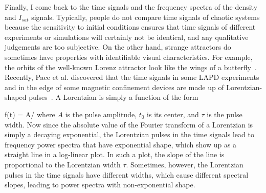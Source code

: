 Finally, I come back to the time signals and the frequency spectra of the density and $I_{sat}$ signals. Typically, people do not compare time signals of chaotic systems because the sensitivity
to initial conditions ensures that time signals of different experiments or simulations will certainly not be identical, and any qualitative judgements are too subjective. On the other hand,
strange attractors do sometimes have properties with identifiable visual characteristics. For example, the orbits of the well-known Lorenz attractor look like the wings of a butterfly~\cite{lorenz1963}.
Recently, Pace et al. discovered that the time signals in some LAPD experiments and in the edge of some magnetic confinement devices
 are made up of Lorentzian-shaped pulses~\cite{pace2008a,pace2008b}. A Lorentzian is simply a function of the form

\beq
\label{lorentz_eqn}
f(t) = A/
\eeq
where $A$ is the pulse amplitude, $t_0$ is its center, and $\tau$ is the pulse width. Now since the absolute value of the Fourier transform of a Lorentzian is simply a decaying exponential,
the Lorentzian pulses in the time signals lead to frequency power spectra that have exponential shape, which show up as a straight line in a log-linear plot. In such a plot, the slope of the line
is proportional to the Lorentzian width $\tau$. Sometimes, however, the Lorentzian
pulses in the time signals have different widths, which cause different spectral slopes, leading to power spectra with non-exponential shape. 

